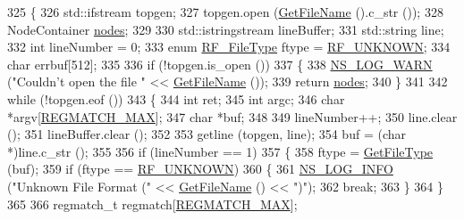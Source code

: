 \begin{DoxyCode}
325 \{
326   std::ifstream topgen;
327   topgen.open (\hyperlink{classns3_1_1TopologyReader_a6d417b0d32aa613887596d769aee6c5d}{GetFileName} ().c\_str ());
328   NodeContainer \hyperlink{visualizer-ideas_8txt_a3e1b3808014a2c68ab0cd0182e041be2}{nodes};
329 
330   std::istringstream lineBuffer;
331   std::string line;
332   \textcolor{keywordtype}{int} lineNumber = 0;
333   \textcolor{keyword}{enum} \hyperlink{classns3_1_1RocketfuelTopologyReader_a04346285f097be349a70c57315a42415}{RF\_FileType} ftype = \hyperlink{classns3_1_1RocketfuelTopologyReader_a04346285f097be349a70c57315a42415abcd0ab0e192c64ebc7684980f7455ec4}{RF\_UNKNOWN};
334   \textcolor{keywordtype}{char} errbuf[512];
335 
336   \textcolor{keywordflow}{if} (!topgen.is\_open ())
337     \{
338       \hyperlink{group__logging_gade7208b4009cdf0e25783cd26766f559}{NS\_LOG\_WARN} (\textcolor{stringliteral}{"Couldn't open the file "} << \hyperlink{classns3_1_1TopologyReader_a6d417b0d32aa613887596d769aee6c5d}{GetFileName} ());
339       \textcolor{keywordflow}{return} \hyperlink{visualizer-ideas_8txt_a3e1b3808014a2c68ab0cd0182e041be2}{nodes};
340     \}
341 
342   \textcolor{keywordflow}{while} (!topgen.eof ())
343     \{
344       \textcolor{keywordtype}{int} ret;
345       \textcolor{keywordtype}{int} argc;
346       \textcolor{keywordtype}{char} *argv[\hyperlink{rocketfuel-topology-reader_8cc_a6060444660288a903075761dcfcb32d3}{REGMATCH\_MAX}];
347       \textcolor{keywordtype}{char} *buf;
348 
349       lineNumber++;
350       line.clear ();
351       lineBuffer.clear ();
352 
353       getline (topgen, line);
354       buf = (\textcolor{keywordtype}{char} *)line.c\_str ();
355 
356       \textcolor{keywordflow}{if} (lineNumber == 1)
357         \{
358           ftype = \hyperlink{classns3_1_1RocketfuelTopologyReader_aa78bf28375ac7abe01358f1ad4026a6d}{GetFileType} (buf);
359           \textcolor{keywordflow}{if} (ftype == \hyperlink{classns3_1_1RocketfuelTopologyReader_a04346285f097be349a70c57315a42415abcd0ab0e192c64ebc7684980f7455ec4}{RF\_UNKNOWN})
360             \{
361               \hyperlink{group__logging_gafbd73ee2cf9f26b319f49086d8e860fb}{NS\_LOG\_INFO} (\textcolor{stringliteral}{"Unknown File Format ("} << \hyperlink{classns3_1_1TopologyReader_a6d417b0d32aa613887596d769aee6c5d}{GetFileName} () << \textcolor{stringliteral}{")"});
362               \textcolor{keywordflow}{break};
363             \}
364         \}
365 
366       regmatch\_t regmatch[\hyperlink{rocketfuel-topology-reader_8cc_a6060444660288a903075761dcfcb32d3}{REGMATCH\_MAX}];

\end{DoxyCode}
